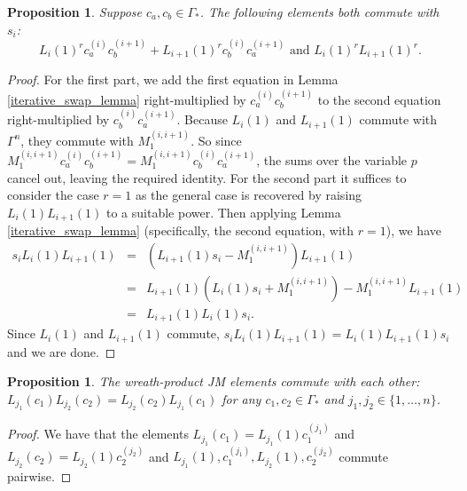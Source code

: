 \documentclass[10pt]{article}
\newtheorem{proposition}[theorem]{Proposition}
\theoremstyle{definition}
\begin{document}
\begin{proposition} \label{special_commuting_proposition}
Suppose $c_a, c_b \in \Gamma_*$. The following elements both commute with~$s_i$:
 \[
 L_i(1)^r c_a^{(i)}c_b^{(i+1)} + L_{i+1}(1)^r c_b^{(i)} c_a^{(i+1)}\text{ and }L_i(1)^r L_{i+1}(1)^r.
 \]
\end{proposition}

\begin{proof}
For the first part, we add the first equation in Lemma \ref{iterative_swap_lemma} right-multiplied by $c_a^{(i)}c_b^{(i+1)}$ to the second equation right-multiplied by $ c_b^{(i)}c_a^{(i+1)}$. Because $L_i(1)$ and $L_{i+1}(1)$ commute with $\Gamma^n$, they commute with $M_1^{(i,i+1)}$. So since $M_1^{(i,i+1)}  c_a^{(i)}c_b^{(i+1)} =  M_1^{(i,i+1)}c_b^{(i)}c_a^{(i+1)}$, the sums over the variable $p$ cancel out, leaving the required identity. For the second part it suffices to consider the case $r=1$ as the general case is recovered by raising $L_i(1)L_{i+1}(1)$ to a suitable power. Then applying Lemma \ref{iterative_swap_lemma} (specifically, the second equation, with $r=1$), we have
\begin{eqnarray*}
s_i L_i(1) L_{i+1}(1) &=& (L_{i+1}(1)s_i - M_1^{(i,i+1)}) L_{i+1}(1) \\
&=& L_{i+1}(1) (L_i(1)s_i + M_1^{(i,i+1)}) - M_1^{(i,i+1)} L_{i+1}(1) \\
&=& L_{i+1}(1)L_i(1)s_i.
\end{eqnarray*}
Since $L_i(1)$ and $L_{i+1}(1)$ commute, $s_i L_i(1)L_{i+1}(1) = L_{i}(1)L_{i+1}(1)s_i$ and we are done.\qedhere
\end{proof}


\begin{proposition} \label{gen_JM_elts_commute}
The wreath-product JM elements commute with each other: $L_{j_1}(c_1) L_{j_2}(c_2)=L_{j_2}(c_2) L_{j_1}(c_1)$ for any $c_1, c_2 \in \Gamma_*$ and $j_1, j_2 \in \{1,\ldots, n\}$.
\end{proposition}
\begin{proof}
We have that the elements $L_{j_1}(c_1) = L_{j_1}(1) c_1^{(j_1)}$ and $L_{j_2}(c_2) = L_{j_2}(1) c_2^{(j_2)}$ and $L_{j_1}(1), c_1^{(j_1)}, L_{j_2}(1), c_2^{(j_2)}$ commute pairwise.
\end{proof}
\end{document}
